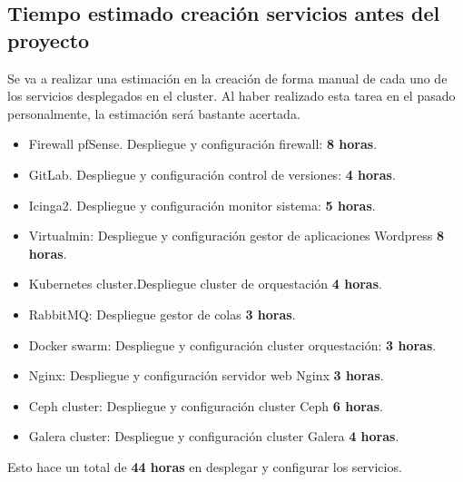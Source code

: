 \subsection{Tiempo estimado creación servicios antes del proyecto}
        \begin{text}
                Se va a realizar una estimación en la creación de forma manual de cada uno de los servicios desplegados en el cluster. Al haber realizado esta tarea en el pasado personalmente, la estimación será bastante acertada.
                
                \begin{itemize}
                        \item Firewall pfSense. Despliegue y configuración firewall: \textbf{8 horas}.
                        \item GitLab. Despliegue y configuración control de versiones: \textbf{4 horas}.
                        \item Icinga2. Despliegue y configuración monitor sistema: \textbf{5 horas}.
                        \item Virtualmin: Despliegue y configuración gestor de aplicaciones Wordpress \textbf{8 horas}.
                        \item Kubernetes cluster.Despliegue cluster de orquestación \textbf{4 horas}.
                        \item RabbitMQ: Despliegue gestor de colas \textbf{3 horas}.
                        \item Docker swarm: Despliegue y configuración cluster orquestación: \textbf{3 horas}.
                        \item Nginx: Despliegue y configuración servidor web Nginx \textbf{3 horas}.
                        \item Ceph cluster: Despliegue y configuración cluster Ceph \textbf{6 horas}.
                        \item Galera cluster: Despliegue y configuración cluster Galera \textbf{4 horas}.
                \end{itemize}
        Esto hace un total de \textbf{44 horas} en desplegar y configurar los servicios.
        \end{text}

